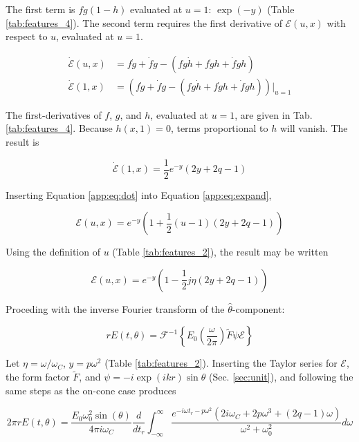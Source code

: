 \documentclass[amsmath,amssymb,aps,prd,10pt,twocolumn]{revtex4}
\begin{document}
The first term is $fg(1-h)$ evaluated at $u = 1$: $\exp(-y)$ (Table \ref{tab:features_4}).  The second term requires the first derivative of $\mathcal{E}(u,x)$ with respect to $u$, evaluated at $u = 1$.

\begin{align}
\dot{\mathcal{E}}(u,x) &= f\dot{g} + \dot{f} g - (f g \dot{h} + f\dot{g} h + \dot{f} g h) \\
\dot{\mathcal{E}}(1,x) &= \left(f\dot{g} + \dot{f} g - (f g \dot{h} + f\dot{g} h + \dot{f} g h)\right)|_{u=1}
\end{align}

The first-derivatives of $f$, $g$, and $h$, evaluated at $u = 1$, are given in Tab. \ref{tab:features_4}.  Because $h(x,1) = 0$, terms proportional to $h$ will vanish.  The result is

\begin{equation}
\dot{\mathcal{E}}(1,x) = \frac{1}{2} e^{-y} \left(2 y + 2q - 1\right) \label{app:eq:dot}
\end{equation}

Inserting Equation \ref{app:eq:dot} into Equation \ref{app:eq:expand},

\begin{equation}
\mathcal{E}(u,x) = e^{-y} \left( 1 + \frac{1}{2} (u-1)\left(  2 y + 2q - 1 \right) \right)
\end{equation}

Using the definition of $u$ (Table \ref{tab:features_2}), the result may be written

\begin{equation}
\mathcal{E}(u,x) = e^{-y} \left( 1 - \frac{1}{2} j\eta\left( 2y + 2q - 1 \right) \right)
\end{equation}

Proceding with the inverse Fourier transform of the $\hat{\theta}$-component:

\begin{equation}
r E(t,\theta) = \mathcal{F}^{-1} \left\lbrace E_0 \left(\frac{\omega}{2\pi}\right) \widetilde{F} \psi \mathcal{E} \right\rbrace
\end{equation}

Let $\eta = \omega/\omega_C$, $y = p \omega^2$ (Table \ref{tab:features_2}).  Inserting the Taylor series for $\mathcal{E}$, the form factor $\widetilde{F}$, and $\psi = -i \exp(ikr) \sin\theta$ (Sec. \ref{sec:unit}), and following the same steps as the on-cone case produces

\begin{widetext}
\begin{equation}
2\pi r E(t,\theta) = \frac{E_0 \omega_0^2 \sin(\theta)}{4 \pi i \omega_C} \frac{d}{dt_{r}} \int_{-\infty}^{\infty} \frac{e^{-i \omega t_r - p\omega^2}  \left( 2 i \omega_C + 2 p \omega^3 + (2 q - 1) \omega \right)}{\omega^2+\omega_0^2}d\omega \label{app:eq:intrigue}
\end{equation}
\end{widetext}
\end{document}
